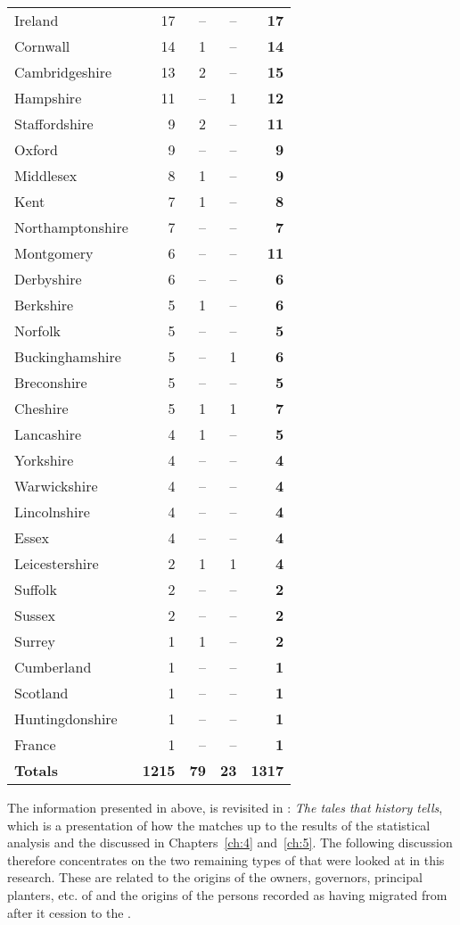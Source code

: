 \begin{longtable}{lrrrr}
Ireland & 17 & -- & -- & \textbf{17}\\
Cornwall & 14 & 1 & -- & \textbf{14}\\
Cambridgeshire & 13 & 2 & -- & \textbf{15}\\
Hampshire & 11 & -- & 1 &\textbf{12}\\
Staffordshire & 9 & 2 & -- & \textbf{11}\\
Oxford & 9 & -- & -- & \textbf{9}\\
Middlesex & 8 & 1 & -- & \textbf{9}\\
Kent & 7 & 1 & -- & \textbf{8}\\
Northamptonshire & 7 & -- & -- & \textbf{7}\\
Montgomery & 6 & -- & -- & \textbf{11}\\
Derbyshire & 6 & -- & -- & \textbf{6}\\
Berkshire & 5 & 1 & -- & \textbf{6}\\
Norfolk & 5 & -- & -- & \textbf{5}\\
Buckinghamshire & 5 & -- & 1 & \textbf{6}\\
Breconshire & 5 & -- & -- & \textbf{5}\\
Cheshire & 5 & 1 & 1 & \textbf{7}\\
Lancashire & 4 & 1 & -- & \textbf{5}\\
Yorkshire & 4 & -- & -- & \textbf{4}\\
Warwickshire & 4 & -- & -- & \textbf{4}\\
Lincolnshire & 4 & -- & -- & \textbf{4}\\
Essex & 4 & -- & -- & \textbf{4}\\
Leicestershire & 2 & 1 & 1 & \textbf{4}\\
Suffolk & 2 & -- & -- & \textbf{2}\\
Sussex & 2 & -- & -- & \textbf{2}\\
Surrey &1 & 1 & -- & \textbf{2}\\
Cumberland & 1 & -- & -- & \textbf{1}\\
Scotland & 1 & -- & -- & \textbf{1}\\
Huntingdonshire & 1 & -- & -- & \textbf{1}\\
France & 1 & -- & -- & \textbf{1}\\
\textbf{Totals} & \textbf{1215} & \textbf{79} & \textbf{23} & \textbf{1317}
\label{Table 6.3}
\end{longtable}

\largerpage
The information presented in  above, is revisited in : \emph{The tales that history tells}, which is a presentation of how the  matches up to the results of the statistical analysis and the  discussed in Chapters~\ref{ch:4} and~\ref{ch:5}. The following discussion therefore concentrates on the two remaining types of  that were looked at in this research. These are related to the origins of the owners, governors, principal planters, etc. of  and the origins of the persons recorded as having migrated from  after it cession to the .

